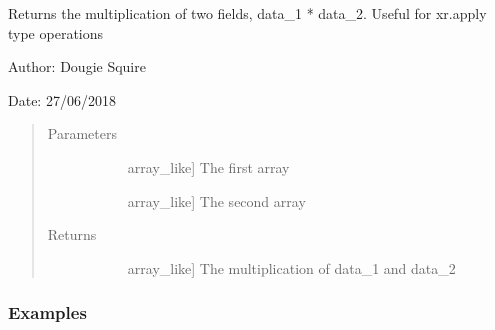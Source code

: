 \documentclass[letterpaper,10pt,english]{sphinxmanual}
\begin{document}
\begin{fulllineitems}
\label{\detokenize{utils_doc:utils.multiply}}
Returns the multiplication of two fields, data\_1 * data\_2. Useful for xr.apply type operations

\begin{DUlineblock}{0em}
\item[] Author: Dougie Squire
\item[] Date: 27/06/2018
\end{DUlineblock}
\begin{quote}\begin{description}
\item[{Parameters}] \leavevmode\begin{description}
\item[{}] \leavevmode{[}array\_like{]}
The first array

\item[{}] \leavevmode{[}array\_like{]}
The second array

\end{description}

\item[{Returns}] \leavevmode\begin{description}
\item[{}] \leavevmode{[}array\_like{]}
The multiplication of data\_1 and data\_2

\end{description}

\end{description}\end{quote}
\subsubsection*{Examples}


\end{fulllineitems}
\end{document}
